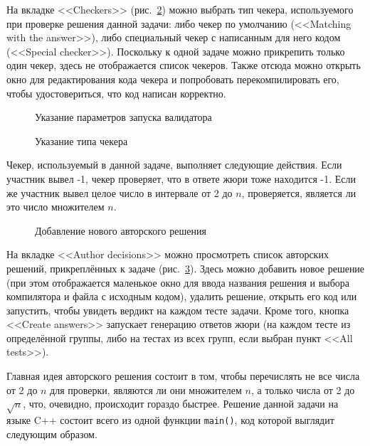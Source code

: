 На вкладке <<Checkers>> (рис.~\ref{screen_checkers}) можно выбрать тип чекера, используемого при проверке решения данной задачи: либо чекер по умолчанию (<<Matching with the answer>>), либо специальный чекер с написанным для него кодом (<<Special checker>>). Поскольку к одной задаче можно прикрепить только один чекер, здесь не отображается список чекеров. Также отсюда можно открыть окно для редактирования кода чекера и попробовать перекомпилировать его, чтобы удостовериться, что код написан корректно.

\begin{figure}[!h]
\caption{Указание параметров запуска валидатора}
\label{screen_validators}
\end{figure}

\begin{figure}[!h]
\caption{Указание типа чекера}
\label{screen_checkers}
\end{figure}

Чекер, используемый в данной задаче, выполняет следующие действия. Если участник вывел -1, чекер проверяет, что в ответе жюри тоже находится -1. Если же участник вывел целое число в интервале от 2 до $n$, проверяется, является ли это число множителем $n$.

\begin{figure}[!ht]
\caption{Добавление нового авторского решения}
\label{screen_author_decisions}
\end{figure}

На вкладке <<Author decisions>> можно просмотреть список авторских решений, прикреплённых к задаче (рис.~\ref{screen_author_decisions}). Здесь можно добавить новое решение (при этом отображается маленькое окно для ввода названия решения и выбора компилятора и файла с исходным кодом), удалить решение, открыть его код или запустить, чтобы увидеть вердикт на каждом тесте задачи. Кроме того, кнопка <<Create answers>> запускает генерацию ответов жюри (на каждом тесте из определённой группы, либо на тестах из всех групп, если выбран пункт <<All tests>>).

Главная идея авторского решения состоит в том, чтобы перечислять не все числа от 2 до $n$ для проверки, являются ли они множителем $n$, а только числа от 2 до $\sqrt{n}$, что, очевидно, происходит гораздо быстрее. Решение данной задачи на языке C++ состоит всего из одной функции \texttt{main()}, код которой выглядит следующим образом.

